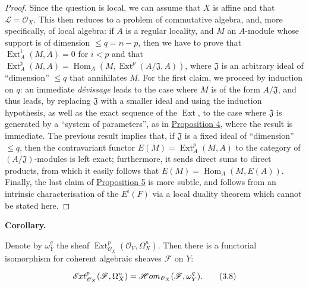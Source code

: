 \documentclass{article}
\newenvironment{itenv}[1]
  {\phantomsection\par\smallskip\noindent\textbf{#1.}\itshape}
  {\par\smallskip}
\newenvironment{eqenv}
  {}
  {}
\newcommand{\oldpage}[1]{\marginpar{\footnotesize$\Big\vert$ \textit{p.~#1}}}
\theoremstyle{definition}
\theoremstyle{definition}
\theoremstyle{definition}
\theoremstyle{definition}
\theoremstyle{remark}
\begin{document}
\begin{proof}
Since the question is local, we can assume that \(X\) is affine and that \({\mathscr{L}}={\mathscr{O}}_X\).
This then reduces to a problem of commutative algebra, and, more specifically, of local algebra:
if \(A\) is a regular locality, and \(M\) an \(A\)-module whose support is of dimension \(\leqslant q=n-p\), then we have to prove that \(\operatorname{Ext}_A^i(M,A)=0\) for \(i<p\) and that \(\operatorname{Ext}_A^p(M,A)=\operatorname{Hom}_A(M,\operatorname{Ext}^p(A/{\mathfrak{J}},A))\), where \({\mathfrak{J}}\) is an arbitrary ideal of ``dimension'' \(\leqslant q\) that annihilates \(M\).
For the first claim, we proceed by induction on \(q\):
an immediate \emph{dévissage} leads to the case where \(M\) is of the form \(A/{\mathfrak{J}}\), and thus leads, by replacing \({\mathfrak{J}}\) with a smaller ideal and using the induction hypothesis, as well as the exact sequence of the \(\operatorname{Ext}\), to the case where \({\mathfrak{J}}\) is generated by a ``system of parameters'', as in \protect\hyperlink{fga-1-proposition-4}{Proposition 4}, where the result is immediate.
The previous result implies that, if \({\mathfrak{J}}\) is a fixed ideal of ``dimension'' \(\leqslant q\), then the contravariant functor \(E(M)=\operatorname{Ext}_A^p(M,A)\) to the category of \((A/{\mathfrak{J}})\)-modules is left exact;
furthermore, it sends direct sums to direct products, from which it easily follows that \(E(M)=\operatorname{Hom}_A(M,E(A))\).
Finally, the last claim of \protect\hyperlink{fga-1-proposition-5}{Proposition 5} is more subtle, and follows from an intrinsic characterisation of the \(E^i(F)\) via a local duality theorem which cannot be stated here.
\end{proof}

\hypertarget{fga-1-proposition-5-corollary}{}
\begin{itenv}{Corollary}

\oldpage{149-09}Denote by \(\omega_Y^q\) the sheaf \(\operatorname{Ext}_{{\mathscr{O}}_X}^p({\mathscr{O}}_Y,\Omega_X^n)\).
Then there is a functorial isomorphism for coherent algebraic sheaves \({\mathscr{F}}\) on \(Y\):

\leavevmode{}%
\begin{eqenv}
\[
  \mathscr{E}\kern -.5pt xt_{{\mathscr{O}}_X}^p({\mathscr{F}},\Omega_X^n) = \mathscr{H}\kern -.5pt om_{{\mathscr{O}}_X}({\mathscr{F}},\omega_Y^q).
\tag{3.8}
\]

\end{eqenv}

\end{itenv}
\end{document}
